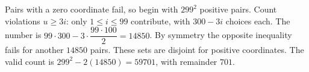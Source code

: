 Pairs with a zero coordinate fail, so begin with $299^2$ positive pairs. Count violations $u\ge3i$: only $1\le i\le99$ contribute, with $300-3i$ choices each. The number is $99\cdot300-3\cdot\dfrac{99\cdot100}{2}=14850$. By symmetry the opposite inequality fails for another $14850$ pairs. These sets are disjoint for positive coordinates. The valid count is $299^2-2(14850)=59701$, with remainder $\boxed{701}$.
